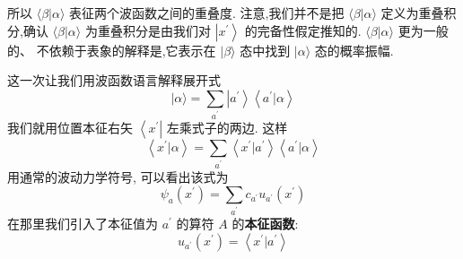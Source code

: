 所以 $\langle \beta | \alpha \rangle$ 表征两个波函数之间的重叠度. 注意,我们并不是把 $\langle \beta | \alpha \rangle$ 定义为重叠积分,确认 $\langle \beta | \alpha \rangle$ 为重叠积分是由我们对 $\left| {x}^{\prime }\right\rangle$ 的完备性假定推知的. $\langle \beta | \alpha \rangle$ 更为一般的、 不依赖于表象的解释是,它表示在 $|\beta \rangle$ 态中找到 $|\alpha \rangle$ 态的概率振幅.

这一次让我们用波函数语言解释展开式
\begin{equation}
	| {\alpha \rangle = \mathop{\sum }\limits_{{a}^{\prime }}\left| {a}^{\prime }\right\rangle \left\langle {{a}^{\prime } | \alpha }\right\rangle }
\end{equation}
我们就用位置本征右矢 $\left\langle {x}^{\prime }\right|$ 左乘式子的两边. 这样
\begin{equation}
	\left\langle {{x}^{\prime } | \alpha }\right\rangle = \mathop{\sum }\limits_{{a}^{\prime }}\left\langle {{x}^{\prime } | {a}^{\prime }}\right\rangle \left\langle {{a}^{\prime } | \alpha }\right\rangle
\end{equation}
用通常的波动力学符号, 可以看出该式为
\begin{equation}
	{\psi }_{a}\left( {x}^{\prime }\right) = \mathop{\sum }\limits_{{a}^{\prime }}{c}_{{a}^{\prime }}{u}_{{a}^{\prime }}\left( {x}^{\prime }\right)
\end{equation}
在那里我们引入了本征值为 ${a}^{\prime }$ 的算符 $A$ 的\textbf{本征函数}:
\begin{equation}
	{u}_{{a}^{\prime }}\left( {x}^{\prime }\right) = \left\langle {{x}^{\prime } | {a}^{\prime }}\right\rangle
\end{equation}

